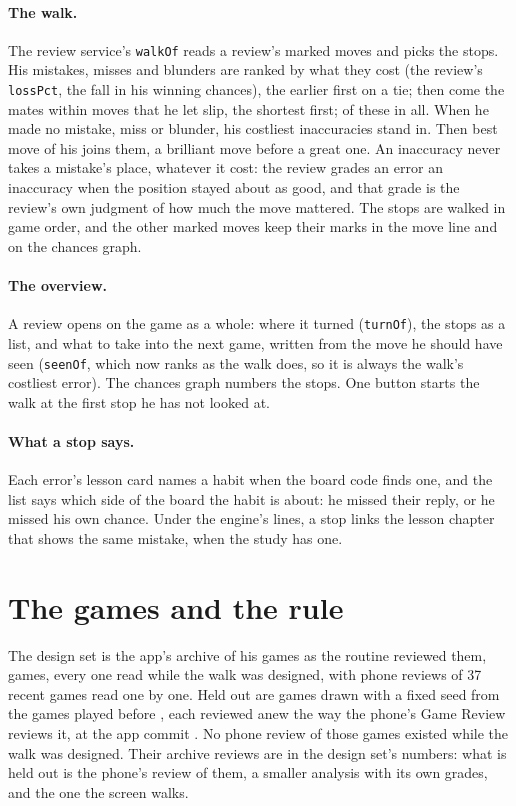 \documentclass[11pt]{article}
\begin{document}
\paragraph{The walk.} The review service's \texttt{walkOf} reads a review's marked moves and
picks the stops. His mistakes, misses and blunders are ranked by what they cost (the review's
\texttt{lossPct}, the fall in his winning chances), the earlier first on a tie; then come the
mates within \MateWithin{} moves that he let slip, the shortest first; \MaxErrors{} of these in
all. When he made no mistake, miss or blunder, his \QuietErrors{} costliest inaccuracies stand
in. Then \MaxHonors{} best move of his joins them, a brilliant move before a great one. An inaccuracy never
takes a mistake's place, whatever it cost: the review grades an error an inaccuracy when the
position stayed about as good, and that grade is the review's own judgment of how much the move
mattered. The stops are walked in game order, and the other marked moves keep their marks in the
move line and on the chances graph.

\paragraph{The overview.} A review opens on the game as a whole: where it turned
(\texttt{turnOf}), the stops as a list, and what to take into the next game, written from the
move he should have seen (\texttt{seenOf}, which now ranks as the walk does, so it is always the
walk's costliest error). The chances graph numbers the stops. One button starts the walk at the
first stop he has not looked at.

\paragraph{What a stop says.} Each error's lesson card names a habit when the board code finds
one, and the list says which side of the board the habit is about: he missed their reply, or he
missed his own chance. Under the engine's lines, a stop links the lesson chapter that shows the
same mistake, when the study has one.

\section{The games and the rule}

The design set is the app's archive of his games as the routine reviewed them, \DesignGames{}
games, every one read while the walk was designed, with phone reviews of 37 recent games read
one by one. Held out are \HeldAsked{} games drawn with a fixed seed from the games played before
\HeldBefore, each reviewed anew the way the phone's Game Review reviews it, at the app commit
\texttt{\AppCommit}. No phone review of those games existed while the walk was designed. Their
archive reviews are in the design set's numbers: what is held out is the phone's review of them,
a smaller analysis with its own grades, and the one the screen walks.
\end{document}
